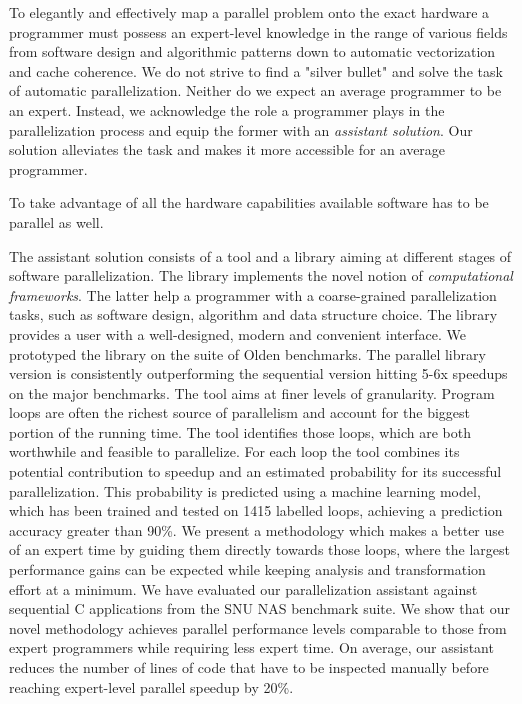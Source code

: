 To elegantly and effectively map a parallel problem onto the exact hardware a programmer must possess an expert-level knowledge in the range of various fields from software design and algorithmic patterns down to automatic vectorization and cache coherence. We do not strive to find a "silver bullet" and solve the task of automatic parallelization. Neither do we expect an average programmer to be an expert. Instead, we acknowledge the role a programmer plays in the parallelization process and equip the former with an \textit{assistant solution}. Our solution alleviates the task and makes it more accessible for an average programmer.\newline\null

 To take advantage of all the hardware capabilities available software has to be parallel as well.


\quad The assistant solution consists of a tool and a library aiming at different stages of software parallelization. The library implements the novel notion of \textit{computational frameworks}. The latter help a programmer with a coarse-grained parallelization tasks, such as software design, algorithm and data structure choice. The library provides a user with a well-designed, modern and convenient interface. We prototyped the library on the suite of Olden benchmarks. The parallel library version is consistently outperforming the sequential version hitting 5-6x speedups on the major benchmarks.\newline\null
\quad The tool aims at finer levels of granularity. Program loops are often the richest source of parallelism and account for the biggest portion of the running time. The tool identifies those loops, which are both worthwhile and feasible to parallelize. For each loop the tool combines its potential contribution to speedup and an estimated probability for its successful parallelization. This probability is predicted using a machine learning model, which has been trained and tested on 1415 labelled loops, achieving a prediction accuracy greater than 90\%. We present a methodology which makes a better use of an expert time by guiding them directly towards those loops, where the largest performance gains can be expected while keeping analysis and transformation effort at a minimum. We have evaluated our parallelization assistant against sequential C applications from the SNU NAS benchmark suite. We show that our novel methodology achieves parallel performance levels comparable to those from expert programmers while requiring less expert time. On average, our assistant reduces the number of lines of code that have to be inspected manually before reaching expert-level parallel speedup by 20\%.






